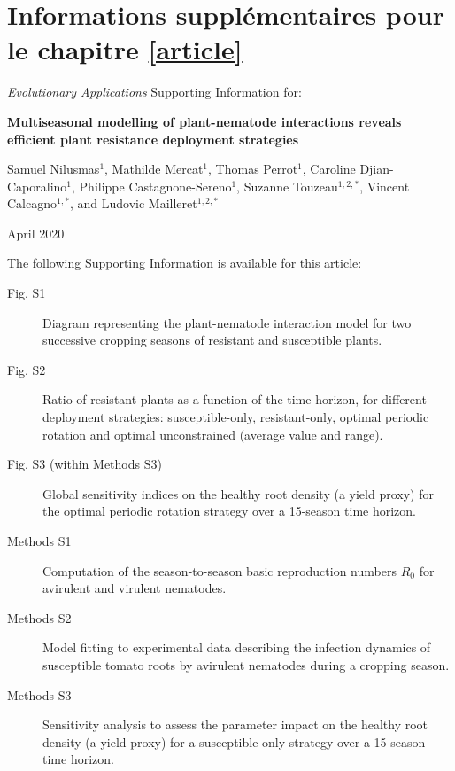 


\chapter{Informations supplémentaires pour le chapitre \ref{article}} 



\noindent \textit{Evolutionary Applications} Supporting Information for:
\bigskip
\bigskip

\noindent  \textbf{Multiseasonal modelling of plant-nematode interactions  reveals efficient plant resistance deployment strategies}
\bigskip

\noindent Samuel Nilusmas$^1$, Mathilde Mercat$^1$, Thomas
Perrot$^1$, Caroline Djian-Caporalino$^1$,
Philippe Castagnone-Sereno$^1$, Suzanne Touzeau$^{1,2,*}$, Vincent
Calcagno$^{1,*}$,  and Ludovic Mailleret$^{1,2,*}$
\bigskip

\bigskip

\noindent
{\small April 2020}
\bigskip


  
\noindent The following Supporting Information is available for this article:

\begin{description}
\item[Fig. S1 ] Diagram representing the plant-nematode interaction
  model for two successive cropping seasons of resistant and
  susceptible plants.

\item[Fig. S2 ] Ratio of resistant plants as a function of the time
  horizon, for different deployment strategies: susceptible-only,
  resistant-only, optimal periodic rotation and optimal unconstrained
  (average value and range).

\item[Fig. S3 (within Methods S3)] Global sensitivity indices on
  the healthy root density (a yield proxy) for the optimal periodic rotation
  strategy over a 15-season time horizon.

\item[Methods S1] Computation of the season-to-season basic
  reproduction numbers $R_0$ for avirulent and virulent nematodes.

\item[Methods S2] Model fitting to experimental data describing the
  infection dynamics of susceptible tomato roots by avirulent
  nematodes during a cropping season.
    
\item[Methods S3] Sensitivity analysis to assess the parameter
    impact on the healthy root density (a yield proxy) for a susceptible-only
  strategy over a 15-season time horizon. 
\end{description}


